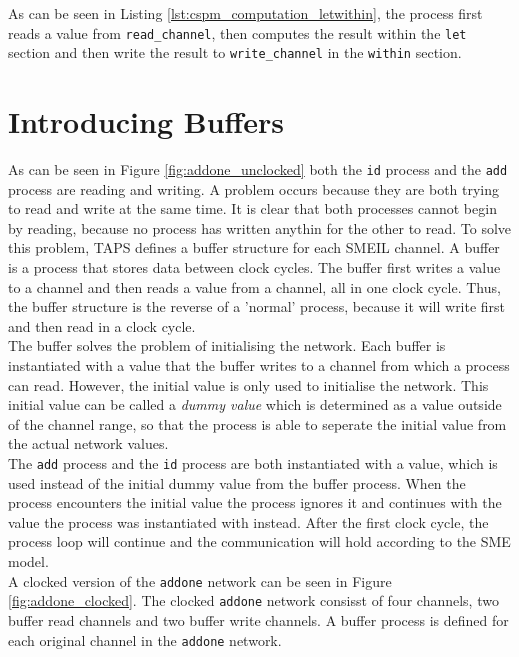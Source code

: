 As can be seen in Listing \ref{lst:cspm_computation_letwithin}, the process first reads a value from \texttt{read\_channel}, then computes the result within the \texttt{let} section and then write the result to \texttt{write\_channel} in the \texttt{within} section.
\section{Introducing Buffers}
As can be seen in Figure \ref{fig:addone_unclocked} both the \texttt{id} process and the \texttt{add} process are reading and writing. A problem occurs because they are both trying to read and write at the same time. It is clear that both processes cannot begin by reading, because no process has written anythin for the other to read.
To solve this problem, TAPS defines a buffer structure for each SMEIL channel. A buffer is a process that stores data between clock cycles. The buffer first writes a value to a channel and then reads a value from a channel, all in one clock cycle. Thus, the buffer structure is the reverse of a 'normal' process, because it will write first and then read in a clock cycle. \\

The buffer solves the problem of initialising the network. Each buffer is instantiated with a value that the buffer writes to a channel from which a process can read. However, the initial value is only used to initialise the network. This initial value can be called a \textit{dummy value} which is determined as a value outside of the channel range, so that the process is able to seperate the initial value from the actual network values. \\

The \texttt{add} process and the \texttt{id} process are both instantiated with a value, which is used instead of the initial dummy value from the buffer process. When the process encounters the initial value the process ignores it and continues with the value the process was instantiated with instead. After the first clock cycle, the process loop will continue and the communication will hold according to the SME model.\\

A clocked version of the \texttt{addone} network can be seen in Figure \ref{fig:addone_clocked}. The clocked \texttt{addone} network consisst of four channels, two buffer read channels and two buffer write channels. A buffer process is defined for each original channel in the \texttt{addone} network. \\

